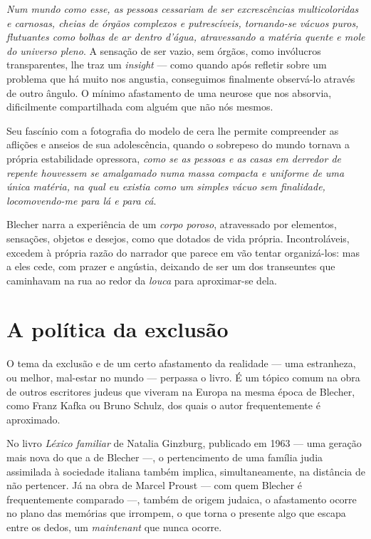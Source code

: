  \textit{Num mundo como esse, as pessoas cessariam de ser excrescências multicoloridas e carnosas, cheias de órgãos complexos e putrescíveis, tornando-se vácuos puros, flutuantes como bolhas de ar dentro d'água, atravessando a matéria quente e mole do universo pleno}. A sensação de ser vazio, sem órgãos, como invólucros transparentes, lhe traz um \textit{insight} --- como quando após refletir sobre um problema que há muito nos angustia, conseguimos finalmente observá-lo através de outro ângulo. O mínimo afastamento de uma neurose que nos absorvia, dificilmente compartilhada com alguém que não nós mesmos.

Seu fascínio com a fotografia do modelo de cera lhe permite compreender as aflições e anseios de sua adolescência, quando o sobrepeso do mundo tornava a própria estabilidade opressora, \textit{como se as pessoas e as casas em derredor de repente houvessem se amalgamado numa massa compacta e uniforme de uma única matéria, na qual eu existia como um simples vácuo sem finalidade, locomovendo-me para lá e para cá}.

Blecher narra a experiência de um \textit{corpo poroso}, atravessado por elementos, sensações, objetos e desejos, como que dotados de vida própria. Incontroláveis, excedem à própria razão do narrador que parece em vão tentar organizá-los: mas a eles cede, com prazer e angústia, deixando de ser um dos transeuntes que caminhavam na rua ao redor da \textit{louca} para aproximar-se dela.

\section{A política da exclusão}

O tema da exclusão e de um certo afastamento da realidade --- uma estranheza, ou melhor, mal-estar no mundo --- perpassa o livro. É um tópico comum na obra de outros escritores judeus que viveram na Europa na mesma época de Blecher, como Franz Kafka ou Bruno Schulz, dos quais o autor frequentemente é aproximado. 

No livro \textit{Léxico familiar} de Natalia Ginzburg, publicado em 1963 --- uma geração mais nova do que a de Blecher ---, o pertencimento de uma família judia assimilada à sociedade italiana também implica, simultaneamente, na distância de não pertencer. Já na obra de Marcel Proust --- com quem Blecher é frequentemente comparado ---, também de origem judaica, o afastamento ocorre no plano das memórias que irrompem, o que torna o presente algo que escapa entre os dedos, um \textit{maintenant} que nunca ocorre. 

